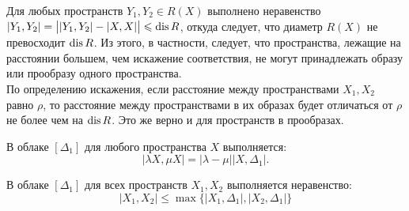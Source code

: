  Для любых пространств $Y_1, Y_2 \in R(X)$ выполнено неравенство
$|Y_1, Y_2| = \big| |Y_1,Y_2| - |X,X|\big| \leqslant \operatorname{dis} R$, откуда следует, что
диаметр  $R(X)$ не превосходит $\operatorname{dis} R$. Из этого, в частности, следует, что
пространства, лежащие на расстоянии большем, чем искажение соответствия, не
могут принадлежать образу или прообразу одного пространства.\\ По определению
искажения, если расстояние между пространствами $X_1, X_2$ равно $\rho$, то
расстояние между пространствами в их образах будет отличаться от $\rho$ не более
чем на $\operatorname{dis} R$. Это же верно и для пространств в прообразах.  \begin{remark} В
облаке $[\Delta_1]$ для любого пространства $X$ выполняется:
	$$|\lambda X, \mu X| = |\lambda - \mu||X,\Delta_1|.$$
 \end{remark} \begin{remark} В облаке
$[\Delta_{1}]$ для всех пространств $X_{1}, X_{2}$ выполняется неравенство:
   $$|X_{1},X_{2}| \le \max\{|X_{1}, \Delta_{1}|,|X_{2},\Delta_{1}|\}$$
 \end{remark}
